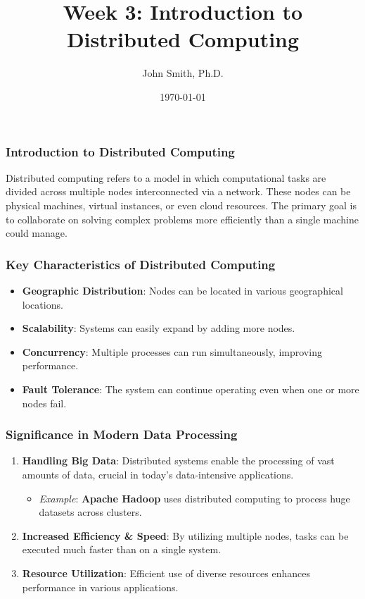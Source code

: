 \documentclass[aspectratio=169]{beamer}
\begin{document}
\frame{\titlepage}

\begin{frame}[fragile]
    \title{Week 3: Introduction to Distributed Computing}
    \author{John Smith, Ph.D.}
    \date{\today}
    \titlepage
\end{frame}

\begin{frame}[fragile]
    \frametitle{Introduction to Distributed Computing}
    Distributed computing refers to a model in which computational tasks are divided across multiple nodes interconnected via a network. 
    These nodes can be physical machines, virtual instances, or even cloud resources. 
    The primary goal is to collaborate on solving complex problems more efficiently than a single machine could manage.
\end{frame}

\begin{frame}[fragile]
    \frametitle{Key Characteristics of Distributed Computing}
    \begin{itemize}
        \item \textbf{Geographic Distribution}: Nodes can be located in various geographical locations.
        \item \textbf{Scalability}: Systems can easily expand by adding more nodes.
        \item \textbf{Concurrency}: Multiple processes can run simultaneously, improving performance.
        \item \textbf{Fault Tolerance}: The system can continue operating even when one or more nodes fail.
    \end{itemize}
\end{frame}

\begin{frame}[fragile]
    \frametitle{Significance in Modern Data Processing}
    \begin{enumerate}
        \item \textbf{Handling Big Data}: Distributed systems enable the processing of vast amounts of data, crucial in today's data-intensive applications.
            \begin{itemize}
                \item \textit{Example}: \textbf{Apache Hadoop} uses distributed computing to process huge datasets across clusters.
            \end{itemize}
        \item \textbf{Increased Efficiency \& Speed}: By utilizing multiple nodes, tasks can be executed much faster than on a single system.
        \item \textbf{Resource Utilization}: Efficient use of diverse resources enhances performance in various applications.
    \end{enumerate}
\end{frame}
\end{document}

